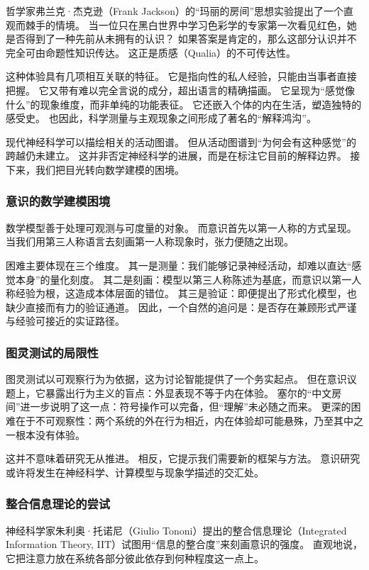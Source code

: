 哲学家弗兰克·杰克逊（Frank Jackson）的“玛丽的房间”思想实验提出了一个直观而棘手的情境。
当一位只在黑白世界中学习色彩学的专家第一次看见红色，她是否得到了一种先前从未拥有的认识？
如果答案是肯定的，那么这部分认识并不完全可由命题性知识传达。
这正是质感（Qualia）的不可传达性。

这种体验具有几项相互关联的特征。
它是指向性的私人经验，只能由当事者直接把握。
它又带有难以完全言说的成分，超出语言的精确描画。
它呈现为“感觉像什么”的现象维度，而非单纯的功能表征。
它还嵌入个体的内在生活，塑造独特的感受史。
也因此，科学测量与主观现象之间形成了著名的“解释鸿沟”。

现代神经科学可以描绘相关的活动图谱。
但从活动图谱到“为何会有这种感觉”的跨越仍未建立。
这并非否定神经科学的进展，而是在标注它目前的解释边界。
接下来，我们把目光转向数学建模的困境。

\subsubsection{意识的数学建模困境}

数学模型善于处理可观测与可度量的对象。
而意识首先以第一人称的方式呈现。
当我们用第三人称语言去刻画第一人称现象时，张力便随之出现。

困难主要体现在三个维度。
其一是测量：我们能够记录神经活动，却难以直达“感觉本身”的量化刻度。
其二是刻画：模型以第三人称陈述为基底，而意识以第一人称经验为根，这造成本体层面的错位。
其三是验证：即便提出了形式化模型，也缺少直接而有力的验证通道。
因此，一个自然的追问是：是否存在兼顾形式严谨与经验可接近的实证路径。

\subsubsection{图灵测试的局限性}

图灵测试以可观察行为为依据，这为讨论智能提供了一个务实起点。
但在意识议题上，它暴露出行为主义的盲点：外显表现不等于内在体验。
塞尔的“中文房间”进一步说明了这一点：符号操作可以完备，但“理解”未必随之而来。
更深的困难在于不可观察性：两个系统的外在行为相近，内在体验却可能悬殊，乃至其中之一根本没有体验。

这并不意味着研究无从推进。
相反，它提示我们需要新的框架与方法。
意识研究或许将发生在神经科学、计算模型与现象学描述的交汇处。

\subsubsection{整合信息理论的尝试}

神经科学家朱利奥·托诺尼（Giulio Tononi）提出的整合信息理论（Integrated Information Theory, IIT）试图用“信息的整合度”来刻画意识的强度。
直观地说，它把注意力放在系统各部分彼此依存到何种程度这一点上。

